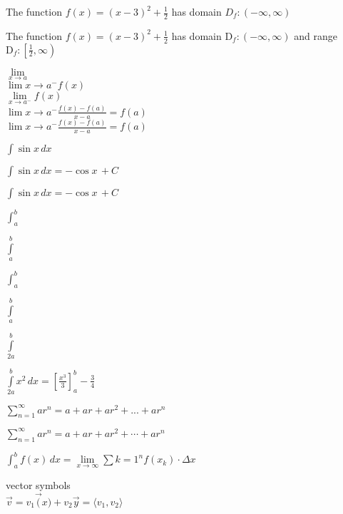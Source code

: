 \documentclass[11]{article}
\begin{document}
The function $f(x)=(x-3)^2+\frac{1}{2}$ has domain $D_f:(-\infty,\infty)$


The function $f(x)=(x-3)^2+\frac{1}{2}$ has domain $\mathrm{D}_f:(-\infty,\infty)$ and range $\mathrm{D}_f:\left[\frac{1}{2},\infty\right)$

$\lim\limits_{x \to a }$\\

$\lim\limits{x \to a^- }f(x)$\\


$\lim\limits_{x \to a^- }f(x)$\\

$\lim\limits{x \to a^- } \frac{f(x)-f(a)}{x-a}=f(a)$\\

$\displaystyle{\lim\limits{x \to a^- } \frac{f(x)-f(a)}{x-a}=f(a)}$\


$\int \sin x \,dx$


$\int \sin x \,dx=-\cos x \,+C$

$\displaystyle{\int \sin x \,dx=-\cos x \,+C}$



$\int_a^b$

$\int \limits_a^b$


$\displaystyle{\int_a^b}$

$\int \limits_a^b$

$\int \limits_{2a}^{b}$





$\int \limits_{2a}^{b}x^2 \,dx=\left[\frac{x^3}{3}\right]_a^b- \frac{3}{4}$



$\displaystyle{\sum \limits_{n=1}^{\infty}ar^n=a+ar+ar^2+...+ar^n}$


$\displaystyle{\sum \limits_{n=1}^{\infty}ar^n=a+ar+ar^2+ \cdots+ar^n}$




$\displaystyle{\int_a^b f(x) \,dx=\lim \limits_{x \to \infty} \sum \limits{k=1}^{n}f(x_k) \cdot \Delta x}$


vector symbols\\


$\vec{v}=v_1 \vec(x)+v_2 \vec{y}=\langle v_1,v_2 \rangle$
\end{document}

